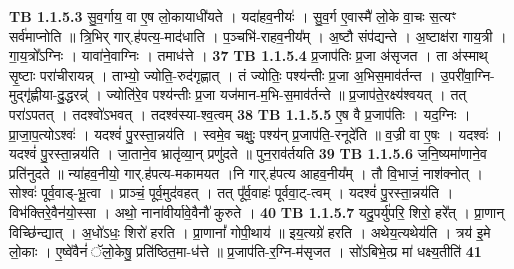 \documentclass[17pt]{extarticle}
\begin{document}
                  \newline
                                \textbf{ TB 1.1.5.3} \newline
                  सु॒व॒र्गाय॒ वा ए॒ष लो॒कायाधी॑यते । यदा॑हव॒नीयः॑ । सु॒व॒र्ग ए॒वास्मै॑ लो॒के वा॒चः स॒त्यꣳ सर्व॑माप्नोति ॥ त्रि॒भिर् गार्.ह॑पत्य॒-माद॑धाति । प॒ञ्चभि॑-राहव॒नीय᳚म् । अ॒ष्टौ संप॑द्यन्ते । अ॒ष्टाक्ष॑रा गाय॒त्री । गा॒य॒त्रो᳚ऽग्निः । यावा॑ने॒वाग्निः । तमाध॑त्ते । \textbf{ 37} \newline
                  \newline
                                \textbf{ TB 1.1.5.4} \newline
                  प्र॒जाप॑तिः प्र॒जा अ॑सृजत । ता अ॑स्माथ् सृ॒ष्टाः परा॑चीरायन्न् । ताभ्यो॒ ज्योति॒-रुद॑गृह्णात् । तं ज्योतिः॒ पश्य॑न्तीः प्र॒जा अ॒भिस॒माव॑र्तन्त । उ॒परी॑वा॒ग्नि-मुद्गृ॑ह्णीया-दु॒द्धरन्न्॑ । ज्योति॑रे॒व पश्य॑न्तीः प्र॒जा यज॑मान-म॒भि-स॒माव॑र्तन्ते ॥ प्र॒जाप॑ते॒रक्ष्य॑श्वयत् । तत् परा॑ऽपतत् । तदश्वो॑ऽभवत् । तदश्व॑स्या-श्व॒त्वम् \textbf{ 38} \newline
                  \newline
                                \textbf{ TB 1.1.5.5} \newline
                  ए॒ष वै प्र॒जाप॑तिः । यद॒ग्निः । प्रा॒जा॒प॒त्योऽश्वः॑ । यदश्वं॑ पु॒रस्ता॒न्नय॑ति । स्वमे॒व चक्षुः॒ पश्य॑न् प्र॒जाप॑ति॒-रनूदे॑ति ॥ व॒ज्री वा ए॒षः । यदश्वः॑ । यदश्वं॑ पु॒रस्ता॒न्नय॑ति । जा॒ताने॒व भ्रातृ॑व्या॒न् प्रणु॑दते ॥ पुन॒राव॑र्तयति \textbf{ 39} \newline
                  \newline
                                \textbf{ TB 1.1.5.6} \newline
                  ज॒नि॒ष्यमा॑णाने॒व प्रति॑नुदते ॥ न्या॑हव॒नीयो॒ गार्.ह॑पत्य-मकामयत ।नि गार्.ह॑पत्य आहव॒नीय᳚म् । तौ वि॒भाजं॒ नाश॑क्नोत् । सोश्वः॑ पूर्व॒वाड्-भू॒त्वा । प्राञ्चं॒ पूर्व॒मुद॑वहत् । तत् पू᳚र्व॒वाहः॑ पूर्ववा॒ट्-त्वम् । यदश्वं॑ पु॒रस्ता॒न्नय॑ति । विभ॑क्तिरे॒वैन॑यो॒स्सा । अथो॒ नाना॑वीर्यावे॒वैनौ॑ कुरुते । \textbf{ 40} \newline
                  \newline
                                \textbf{ TB 1.1.5.7} \newline
                  यदु॒पर्यु॑परि॒ शिरो॒ हरे᳚त् । प्रा॒णान् विच्छि॑न्द्यात् । अ॒धो॑ऽधः॒ शिरो॑ हरति । प्रा॒णानां᳚ गोपी॒थाय॑ ॥ इय॒त्यग्रे॑ हरति । अथेय॒त्यथेय॑ति । त्रय॑ इ॒मे लो॒काः । ए॒ष्वे॑वैनं॑ ॅलो॒केषु॒ प्रति॑ष्ठित॒मा-ध॑त्ते ॥ प्र॒जाप॑ति-र॒ग्नि-म॑सृजत । सो॑ऽबिभे॒त्प्र मा॑ धक्ष्य॒तीति॑ \textbf{ 41} \newline
\end{document}

